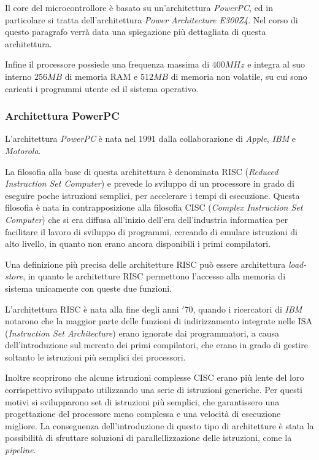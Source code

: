 Il core del microcontrollore è basato su un'architettura \textit{PowerPC}, ed in particolare si tratta dell'architettura \textit{Power Architecture E300Z4}. Nel corso di questo paragrafo verrà data una spiegazione più dettagliata di questa architettura.

Infine il processore possiede una frequenza massima di $400MHz$ e integra al suo interno $256MB$ di memoria RAM e $512MB$ di memoria non volatile, su cui sono caricati i programmi utente ed il sistema operativo.

\subsubsection{Architettura PowerPC}
L'architettura \textit{PowerPC} è nata nel $1991$ dalla collaborazione di \textit{Apple}, \textit{IBM} e \textit{Motorola}. 

La filosofia alla base di questa architettura è denominata RISC (\textit{Reduced Instruction Set Computer}) e prevede lo sviluppo di un processore in grado di eseguire poche istruzioni semplici, per accelerare i tempi di esecuzione. Questa filosofia è nata in contrapposizione alla filosofia CISC (\textit{Complex Instruction Set Computer}) che si era diffusa all'inizio dell'era dell'industria informatica per facilitare il lavoro di sviluppo di programmi, cercando di emulare istruzioni di alto livello, in quanto non erano ancora disponibili i primi compilatori.

Una definizione più precisa delle architetture RISC può essere architettura \textit{load-store}, in quanto le architetture RISC permettono l'accesso alla memoria di sistema unicamente con queste due funzioni.

L'architettura RISC è nata alla fine degli anni $'70$, quando i ricercatori di \textit{IBM} notarono che la maggior parte delle funzioni di indirizzamento integrate nelle ISA (\textit{Instruction Set Architecture}) erano ignorate dai programmatori, a causa dell'introduzione sul mercato dei primi compilatori, che erano in grado di gestire soltanto le istruzioni più semplici dei processori.

Inoltre scoprirono che alcune istruzioni complesse CISC erano più lente del loro corrispettivo sviluppato utilizzando una serie di istruzioni generiche. Per questi motivi si svilupparono set di istruzioni più semplici, che garantissero una progettazione del processore meno complessa e una velocità di esecuzione migliore.
La conseguenza dell'introduzione di questo tipo di architetture è stata la possibilità di sfruttare soluzioni di parallellizzazione delle istruzioni, come la \textit{pipeline}.

